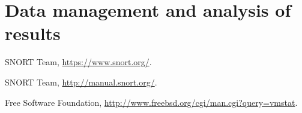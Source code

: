 \documentclass[10pt,a4paper]{article}
\begin{document}
    

    \section{Data management and analysis of results}
    \label{sec:data-management-result-analysis}
    \lipsum[1]
    
    \begin{thebibliography}{9}

      SNORT Team,
      \url{https://www.snort.org/}.

      SNORT Team,
      \url{http://manual.snort.org/}.

      Free Software Foundation,
      \url{http://www.freebsd.org/cgi/man.cgi?query=vmstat}.
    \end{thebibliography}
\end{document}
